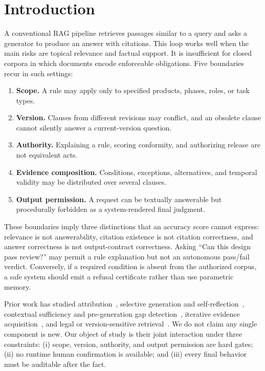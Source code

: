 \documentclass[11pt]{article}
\begin{document}
\section{Introduction}
\label{sec:introduction}

A conventional RAG pipeline retrieves passages similar to a query and asks a generator to produce an answer with citations. This loop works well when the main risks are topical relevance and factual support. It is insufficient for closed corpora in which documents encode enforceable obligations. Five boundaries recur in such settings:

\begin{enumerate}[nosep,leftmargin=*]
  \item \textbf{Scope.} A rule may apply only to specified products, phases, roles, or task types.
  \item \textbf{Version.} Clauses from different revisions may conflict, and an obsolete clause cannot silently answer a current-version question.
  \item \textbf{Authority.} Explaining a rule, scoring conformity, and authorizing release are not equivalent acts.
  \item \textbf{Evidence composition.} Conditions, exceptions, alternatives, and temporal validity may be distributed over several clauses.
  \item \textbf{Output permission.} A request can be textually answerable but procedurally forbidden as a system-rendered final judgment.
\end{enumerate}

These boundaries imply three distinctions that an accuracy score cannot express: relevance is not answerability, citation existence is not citation correctness, and answer correctness is not output-contract correctness. Asking ``Can this design pass review?'' may permit a rule explanation but not an autonomous pass/fail verdict. Conversely, if a required condition is absent from the authorized corpus, a safe system should emit a refusal certificate rather than use parametric memory.

Prior work has studied attribution~\citep{gao2023alce,bohnet2022attributed,ru2024ragchecker,pipitone2024legalbench}, selective generation and self-reflection~\citep{asai2023selfrag,qiu2026surerag,zhao2026grace}, contextual sufficiency and pre-generation gap detection~\citep{joren2024sufficient,chen2026rinse}, iterative evidence acquisition~\citep{li2026s2g,asl2025fairrag,liu2026a2rag}, and legal or version-sensitive retrieval~\citep{ju2026citationclosure,demir2026citationsmislead,huwiler2025versionrag}. We do not claim any single component is new. Our object of study is their joint interaction under three constraints: (i) scope, version, authority, and output permission are hard gates; (ii) no runtime human confirmation is available; and (iii) every final behavior must be auditable after the fact.
\end{document}
